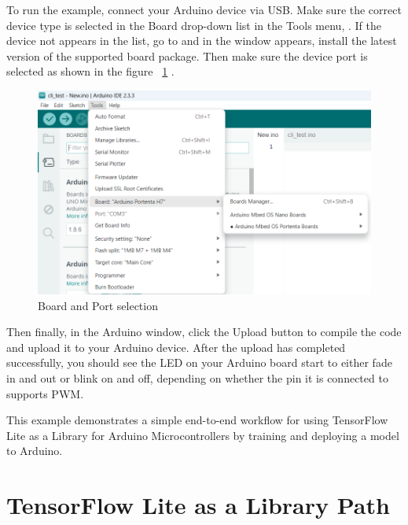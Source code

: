 \begin{code}
	
\end{code}

To run the example, connect your Arduino device via USB. Make sure the correct device type is selected in the Board drop-down list in the Tools menu, . If the device not appears in the list, go to  and in the window appears, install the latest version of the supported board package. Then make sure the device port is selected as shown in the figure ~\ref{BoardPort} \cite{tensorflowblog:2024}.

\begin{figure}
	\begin{center}
		\includegraphics[width=0.7\linewidth]{Images/TensorFlowLite/BoardPortSelection.png}
		\caption{Board and Port selection}
		\label{BoardPort}
	\end{center}
\end{figure}

Then finally, in the Arduino window, click the Upload button to compile the code and upload it to your Arduino device.
After the upload has completed successfully, you should see the LED on your Arduino board start to either fade in and out or blink on and off, depending on whether the pin it is connected to supports PWM.

This example demonstrates a simple end-to-end workflow for using TensorFlow Lite as a Library for Arduino Microcontrollers by training and deploying a model to Arduino.

\section{TensorFlow Lite as a Library Path}

